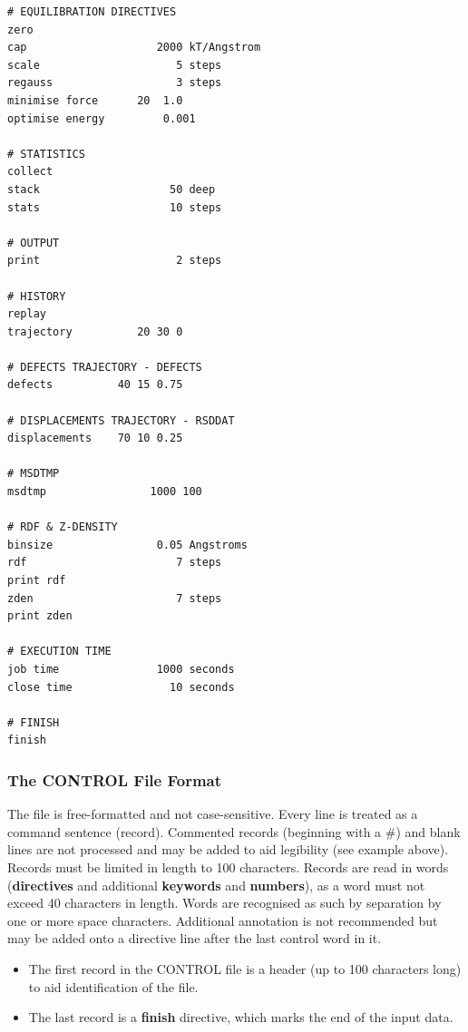 \begin{verbatim}
# EQUILIBRATION DIRECTIVES
zero
cap                    2000 kT/Angstrom
scale                     5 steps
regauss                   3 steps
minimise force      20  1.0
optimise energy         0.001

# STATISTICS
collect
stack                    50 deep
stats                    10 steps

# OUTPUT
print                     2 steps

# HISTORY
replay
trajectory          20 30 0

# DEFECTS TRAJECTORY - DEFECTS
defects          40 15 0.75

# DISPLACEMENTS TRAJECTORY - RSDDAT
displacements    70 10 0.25

# MSDTMP
msdtmp                1000 100

# RDF & Z-DENSITY
binsize                0.05 Angstroms
rdf                       7 steps
print rdf
zden                      7 steps
print zden

# EXECUTION TIME
job time               1000 seconds
close time               10 seconds

# FINISH
finish
\end{verbatim}

\subsubsection{The CONTROL File Format}

The file is free-formatted and not case-sensitive.  Every line is
treated as a command sentence (record).  Commented records
(beginning with a \#) and blank lines are not processed and may be
added to aid legibility (see example above).  Records must be
limited in length to 100 characters.  Records are read in words
({\bf directives} and additional {\bf keywords} and {\bf
numbers}), as a word must not exceed 40 characters in length.
Words are recognised as such by separation by one or more space
characters.  Additional annotation is not recommended but may be
added onto a directive line after the last control word in it.

\begin{itemize}
\item The first record in the CONTROL file is a header (up to 100
characters long) to aid identification of the file.
\item The last record is a {\bf finish} directive, which marks
the end of the input data.
\end{itemize}

